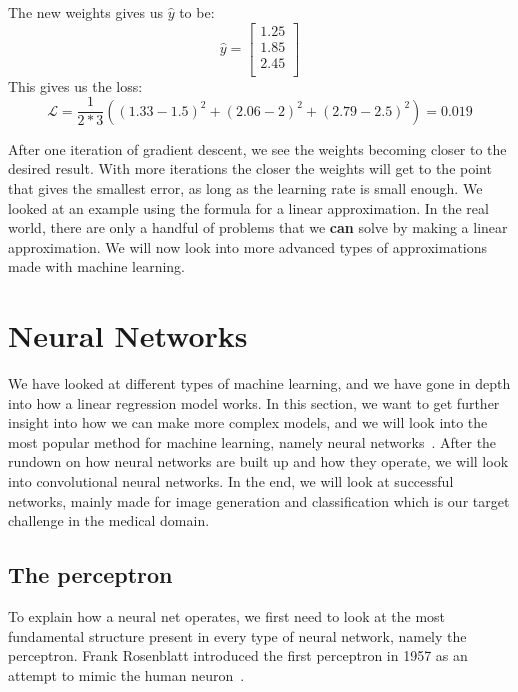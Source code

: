 \noindent The new weights gives us $\hat{y}$ to be:
\begin{equation}
    \hat{y}=\left[\begin{array}{c} 1.25\\ 1.85\\ 2.45\\ \end{array}\right]
\end{equation}
This gives us the loss:
\begin{equation}
   \mathcal{L} = \frac{1}{2*3} \left( {(1.33-1.5)}^2+{(2.06-2)}^2+{(2.79-2.5)}^2 \right) = 0.019
\end{equation}

\noindent After one iteration of gradient descent, we see the weights becoming closer to the desired result. With more iterations the closer the weights will get to the point that gives the smallest error, as long as the learning rate is small enough. 
We looked at an example using the formula for a linear approximation. In the real world, there are only a handful of problems that we \textbf{can} solve by making a linear approximation. We will now look into more advanced types of approximations made with machine learning.

    

\section{Neural Networks}
We have looked at different types of machine learning, and we have gone in depth into how a linear regression model works. In this section, we want to get further insight into how we can make more complex models, and we will look into the most popular method for machine learning, namely neural networks~\cite{haykin1994neural}. 
After the rundown on how neural networks are built up and how they operate, we will look into convolutional neural networks. In the end, we will look at successful networks, mainly made for image generation and classification which is our target challenge in the medical domain. 


\subsection{The perceptron}
\label{cha:perceptron}
To explain how a neural net operates, we first need to look at the most fundamental structure present in every type of neural network, namely the perceptron.
Frank Rosenblatt introduced the first perceptron in 1957 as an attempt to mimic the human neuron~\cite{perceptron}.  


